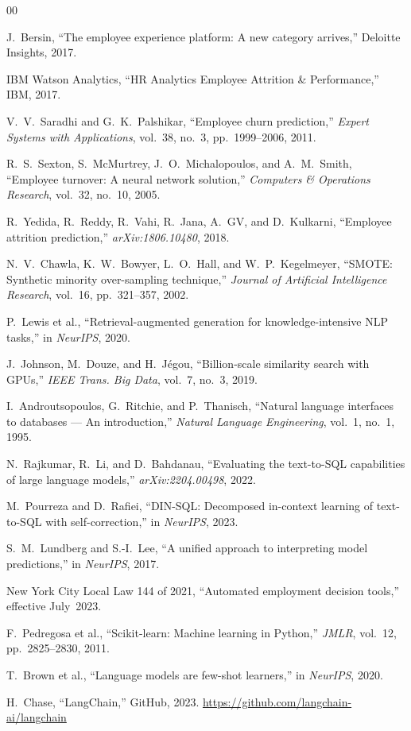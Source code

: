 \documentclass[conference]{IEEEtran}
\begin{document}
\begin{thebibliography}{00}

 J.~Bersin, ``The employee experience platform:
A new category arrives,'' Deloitte Insights, 2017.

 IBM Watson Analytics, ``HR Analytics Employee
Attrition \& Performance,'' IBM, 2017.

 V.~V.~Saradhi and G.~K.~Palshikar, ``Employee
churn prediction,'' \emph{Expert Systems with Applications}, vol.~38,
no.~3, pp.~1999--2006, 2011.

 R.~S.~Sexton, S.~McMurtrey, J.~O.~Michalopoulos,
and A.~M.~Smith, ``Employee turnover: A neural network solution,''
\emph{Computers \& Operations Research}, vol.~32, no.~10, 2005.

 R.~Yedida, R.~Reddy, R.~Vahi, R.~Jana,
A.~GV, and D.~Kulkarni, ``Employee attrition prediction,''
\emph{arXiv:1806.10480}, 2018.

 N.~V.~Chawla, K.~W.~Bowyer, L.~O.~Hall, and
W.~P.~Kegelmeyer, ``SMOTE: Synthetic minority over-sampling
technique,'' \emph{Journal of Artificial Intelligence Research},
vol.~16, pp.~321--357, 2002.

 P.~Lewis et al., ``Retrieval-augmented generation
for knowledge-intensive NLP tasks,'' in \emph{NeurIPS}, 2020.

 J.~Johnson, M.~Douze, and H.~J\'egou,
``Billion-scale similarity search with GPUs,''
\emph{IEEE Trans. Big Data}, vol.~7, no.~3, 2019.

 I.~Androutsopoulos, G.~Ritchie, and
P.~Thanisch, ``Natural language interfaces to databases --- An
introduction,'' \emph{Natural Language Engineering}, vol.~1, no.~1,
1995.

 N.~Rajkumar, R.~Li, and D.~Bahdanau,
``Evaluating the text-to-SQL capabilities of large language
models,'' \emph{arXiv:2204.00498}, 2022.

 M.~Pourreza and D.~Rafiei, ``DIN-SQL:
Decomposed in-context learning of text-to-SQL with
self-correction,'' in \emph{NeurIPS}, 2023.

 S.~M.~Lundberg and S.-I.~Lee, ``A unified
approach to interpreting model predictions,'' in \emph{NeurIPS},
2017.

 New York City Local Law 144 of 2021,
``Automated employment decision tools,'' effective July~2023.

 F.~Pedregosa et al., ``Scikit-learn: Machine
learning in Python,'' \emph{JMLR}, vol.~12, pp.~2825--2830, 2011.

 T.~Brown et al., ``Language models are few-shot
learners,'' in \emph{NeurIPS}, 2020.

 H.~Chase, ``LangChain,'' GitHub, 2023.
\url{https://github.com/langchain-ai/langchain}

\end{thebibliography}
\end{document}
